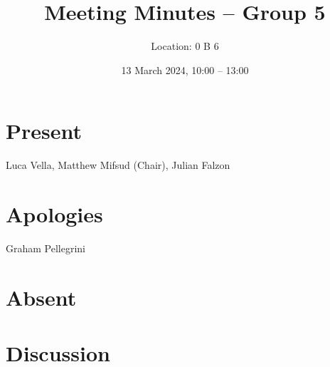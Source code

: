 \documentclass{cce2014-meetings}
\title{Meeting Minutes -- Group 5}
\author{Location: 0 B 6}
\date{13 March 2024, 10:00 -- 13:00}
\begin{document}
\maketitle

\section*{Present}
Luca Vella,
Matthew Mifsud (Chair),
Julian Falzon

\section*{Apologies}
Graham Pellegrini

\section*{Absent}

\section*{Discussion}
\end{document}
